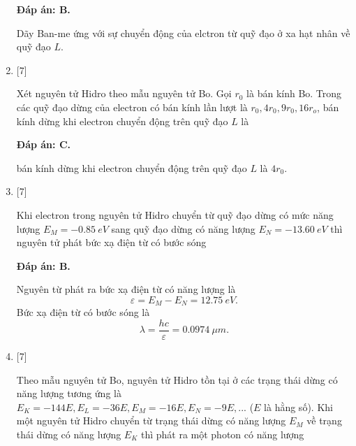 \begin{enumerate}[label=\bfseries Câu \arabic*:]
	\loigiai
	{		\textbf{Đáp án: B.}
		
		Dãy Ban-me ứng với sự chuyển động của elctron từ quỹ đạo ở xa hạt nhân về quỹ  đạo $ L $.
	}	
	
	
	
	\item {} [7]
	\cauhoi
	{Xét nguyên tử Hidro theo mẫu nguyên tử Bo. Gọi $ r_{0} $ là bán kính Bo. Trong các quỹ đạo dừng của electron có bán kính lần lượt là $ r_{0}, 4 r_{0}, 9 r_{0}, 16 r_{o} $, bán kính dừng khi electron chuyển động trên quỹ đạo $ L $ là
		
	}
	
	\loigiai
	{		\textbf{Đáp án: C.}
		
		bán kính dừng khi electron chuyển động trên quỹ đạo $ L $ là $ 4 r_{0} $. 
	}	
	
	\item {} [7]
		\cauhoi
	{Khi electron trong nguyên tử Hidro chuyển từ quỹ đạo dừng có mức năng lượng $ E_{M} = \SI{-0,85}{eV} $ sang quỹ đạo dừng có năng lượng $ E_{N} = \SI{-13,60}{eV} $ thì nguyên tử phát bức xạ điện từ có bước sóng
	}
	
	\loigiai
	{		\textbf{Đáp án: B.}
		
		Nguyên từ phát ra bức xạ điện từ có năng lượng là
		$$
		\varepsilon = E_{M} - E_{N} = \SI{12,75}{eV}.
		$$
		Bức xạ điện từ có bước sóng là
		$$
		\lambda = \dfrac{hc}{\varepsilon} = \SI{0,0974}{\mu m}.
		$$
	}	
	
	\item {} [7]
		\cauhoi
	{Theo mẫu nguyên tử Bo, nguyên tử Hidro tồn tại ở các trạng thái dừng có năng lượng tương ứng là $ E_{K} = -144E, E_{L} = -36E, E_{M} = -16E, E_{N} = -9E,... $ ($ E $ là hằng số). Khi một nguyên tử Hidro chuyển từ trạng thái dừng có năng lượng $ E_{M} $ về trạng thái dừng có năng lượng $ E_{K} $ thì phát ra một photon có năng lượng
	}
	

\end{enumerate}
